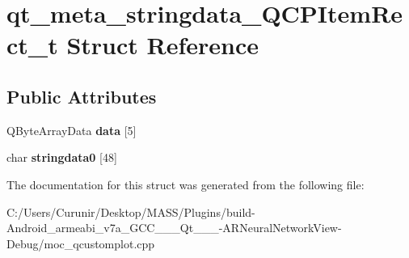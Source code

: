 \hypertarget{structqt__meta__stringdata___q_c_p_item_rect__t}{}\section{qt\+\_\+meta\+\_\+stringdata\+\_\+\+Q\+C\+P\+Item\+Rect\+\_\+t Struct Reference}
\label{structqt__meta__stringdata___q_c_p_item_rect__t}
\subsection*{Public Attributes}
\begin{DoxyCompactItemize}
\item 
\mbox{\label{structqt__meta__stringdata___q_c_p_item_rect__t_afa834fc750155dc73e11d8649c4a861f}} 
Q\+Byte\+Array\+Data {\bfseries data} \mbox{[}5\mbox{]}
\item 
\mbox{\label{structqt__meta__stringdata___q_c_p_item_rect__t_adc2c17c01e4f637938357d8675d7914d}} 
char {\bfseries stringdata0} \mbox{[}48\mbox{]}
\end{DoxyCompactItemize}


The documentation for this struct was generated from the following file\+:\begin{DoxyCompactItemize}
\item 
C\+:/\+Users/\+Curunir/\+Desktop/\+M\+A\+S\+S/\+Plugins/build-\/\+Android\+\_\+armeabi\+\_\+v7a\+\_\+\+G\+C\+C\+\_\+\_\+\_\+\+Qt\+\_\+\_\+\_-\/\+A\+R\+Neural\+Network\+View-\/\+Debug/moc\+\_\+qcustomplot.\+cpp\end{DoxyCompactItemize}
